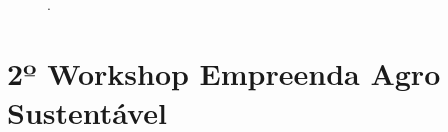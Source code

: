 \begin{apendicesenv}
\begin{figure}[H]
\qquad
{}
.
\label{figura_29_1}
\end{figure}



\chapter{2º Workshop Empreenda Agro Sustentável}
\label{app:workshop_2}


\end{apendicesenv}
